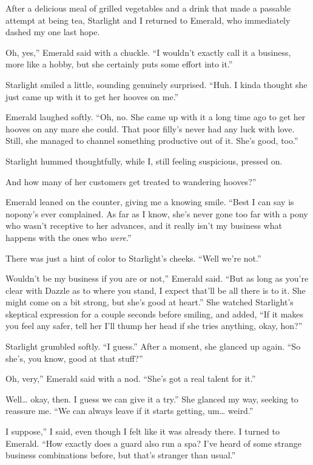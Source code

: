 After a delicious meal of grilled vegetables and a drink that made a passable attempt at being tea, Starlight and I returned to Emerald, who immediately dashed my one last hope.

\leavevmode{}Oh, yes,” Emerald said with a chuckle. “I wouldn’t exactly call it a business, more like a hobby, but she certainly puts some effort into it.”

Starlight smiled a little, sounding genuinely surprised. “Huh. I kinda thought she just came up with it to get her hooves on me.”

Emerald laughed softly. “Oh, no. She came up with it a long time ago to get her hooves on any mare she could. That poor filly’s never had any luck with love. Still, she managed to channel something productive out of it. She’s good, too.”

Starlight hummed thoughtfully, while I, still feeling suspicious, pressed on.

\leavevmode{}And how many of her customers get treated to wandering hooves?”

Emerald leaned on the counter, giving me a knowing smile. “Best I can say is nopony’s ever complained. As far as I know, she’s never gone too far with a pony who wasn’t receptive to her advances, and it really isn’t my business what happens with the ones who \textit{were}.”

There was just a hint of color to Starlight’s cheeks. “Well we’re not.”

\leavevmode{}Wouldn’t be my business if you are or not,” Emerald said. “But as long as you’re clear with Dazzle as to where you stand, I expect that’ll be all there is to it. She might come on a bit strong, but she’s good at heart.” She watched Starlight’s skeptical expression for a couple seconds before smiling, and added, “If it makes you feel any safer, tell her I’ll thump her head if she tries anything, okay, hon?”

Starlight grumbled softly. “I guess.” After a moment, she glanced up again. “So she’s, you know, good at that stuff?”

\leavevmode{}Oh, very,” Emerald said with a nod. “She’s got a real talent for it.”

\leavevmode{}Well… okay, then. I guess we can give it a try.” She glanced my way, seeking to reassure me. “We can always leave if it starts getting, um… weird.”

\leavevmode{}I suppose,” I said, even though I felt like it was already there. I turned to Emerald. “How exactly does a guard also run a spa? I’ve heard of some strange business combinations before, but that’s stranger than usual.”

